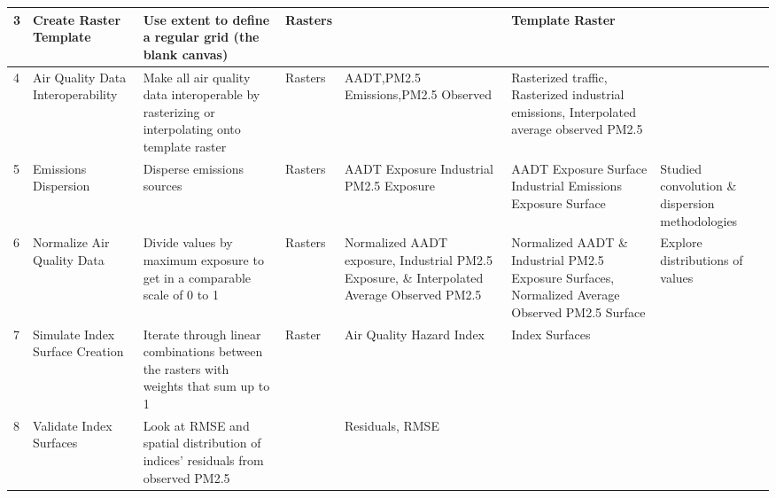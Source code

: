 \documentclass[article,12pt]{article}
\numberwithin{equation}{section}
\begin{document}
\begin{adjustwidth}{-.88in}{-.88in}
{\begin{tabular}{|l|p{.11\linewidth}|p{.17\linewidth}|p{.065\linewidth}|p{.125\linewidth}|p{.23\linewidth}|p{.15\linewidth}|}
		3 & Create \newline Raster Template & Use extent to define a regular grid (the blank canvas) & Rasters &   & Template Raster &   \\ \hline	   
		4 & Air Quality Data Interoperability & Make all air quality data interoperable by rasterizing or interpolating onto template raster & Rasters &  AADT,\newline PM2.5 Emissions,\newline PM2.5 Observed  & Rasterized traffic, \newline Rasterized industrial emissions, \newline Interpolated average observed PM2.5 & \\ \hline
		5 & Emissions \newline Dispersion & Disperse emissions sources  &    Rasters                                     &   AADT Exposure \newline Industrial PM2.5 Exposure                                                & AADT Exposure Surface \newline Industrial Emissions Exposure Surface                                                                                                                                                                                                        & Studied convolution \& dispersion methodologies            \\ \hline
		6 &  Normalize Air Quality Data & Divide values by maximum exposure to get in a comparable scale of 0 to 1 & Rasters & Normalized AADT exposure, Industrial PM2.5 Exposure, \& Interpolated Average Observed PM2.5  & Normalized AADT \& Industrial PM2.5 Exposure Surfaces, Normalized Average Observed PM2.5 Surface & Explore distributions of values \\ \hline   
		7 & Simulate Index Surface Creation                            & Iterate through linear combinations between the rasters with weights that sum up to 1 &    Raster               & Air Quality Hazard Index                                             &    Index Surfaces                                                                                                                                         &             \\ \hline
		8 & Validate Index Surfaces &  Look at RMSE and spatial distribution of indices' residuals from observed PM2.5            &                                        &        Residuals, RMSE                                          &                                                                                                                                                                                                        &           \\ \hline

\end{tabular}}
\end{adjustwidth}
\end{document}

